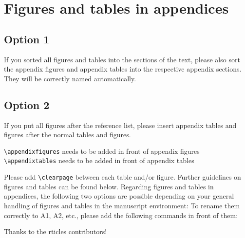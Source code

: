 \documentclass[gc, manuscript]{copernicus}
\begin{document}

\appendix
\section{Figures and tables in appendices}
\subsection{Option 1}

If you sorted all figures and tables into the sections of the text,
please also sort the appendix figures and appendix tables into the
respective appendix sections. They will be correctly named
automatically.

\subsection{Option 2}

If you put all figures after the reference list, please insert appendix
tables and figures after the normal tables and figures.

\texttt{\textbackslash{}appendixfigures} needs to be added in front of
appendix figures \texttt{\textbackslash{}appendixtables} needs to be
added in front of appendix tables

Please add \texttt{\textbackslash{}clearpage} between each table and/or
figure. Further guidelines on figures and tables can be found below.
Regarding figures and tables in appendices, the following two options
are possible depending on your general handling of figures and tables in
the manuscript environment: To rename them correctly to A1, A2, etc.,
please add the following commands in front of them:
\noappendix




\begin{acknowledgements}
Thanks to the rticles contributors!
\end{acknowledgements}
\end{document}
